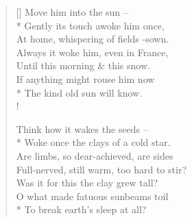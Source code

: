 \documentclass[MAIN]{subfiles}
\begin{document}
\begin{verse}[\versewidth]
Move him into the sun --\\*
\vin Gently its touch awoke him once,\\
At home, whispering of fields -sown.\\
\vin Always it woke him, even in France,\\
Until this morning \& this snow.\\
If anything might rouse him now\\*
The kind old sun will know.\\!

Think how it wakes the seeds --\\*
\vin Woke once the clays of a cold star.\\
Are limbs, so dear-achieved, are sides\\
\vin Full-nerved, still warm, too hard to stir?\\
Was it for this the clay grew tall?\\
O what made fatuous sunbeams toil\\*
To break earth's sleep at all?
\end{verse}
\end{document}

